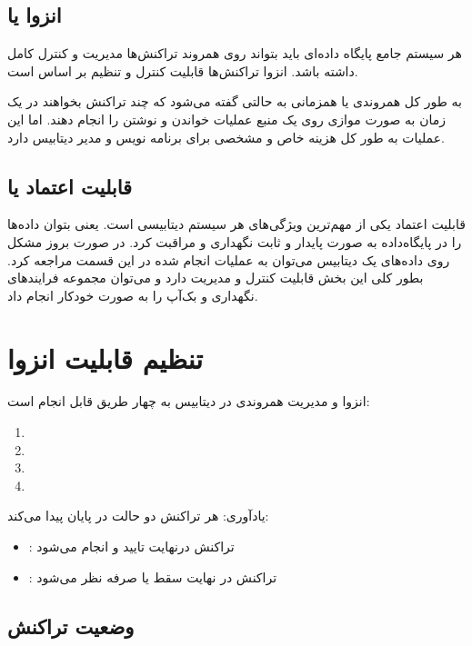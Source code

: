 \documentclass[a4paper]{article}
\begin{document}
\subsection{انزوا یا }

هر سیستم جامع پایگاه داده‌ای باید بتواند روی همروند تراکنش‌ها مدیریت و کنترل
کامل داشته باشد. انزوا تراکنش‌ها قابلیت کنترل و تنظیم بر اساس  است.

به طور کل همروندی یا همزمانی به حالتی گفته می‌شود که چند تراکنش بخواهند در یک
زمان به صورت موازی روی یک منبع عملیات خواندن و نوشتن را انجام دهند. اما این
عملیات به طور کل هزینه خاص و مشخصی برای برنامه نویس و مدیر دیتابیس دارد.

\subsection{قابلیت اعتماد یا }

قابلیت اعتماد یکی از مهم‌ترین ویژگی‌های هر سیستم دیتابیسی است. یعنی بتوان
داده‌ها را در پایگاه‌داده به صورت پایدار و ثابت نگهداری و مراقبت کرد. در صورت
بروز مشکل روی داده‌های یک دیتابیس می‌توان به عملیات انجام شده در این قسمت مراجعه
کرد. بطور کلی این بخش قابلیت کنترل و مدیریت دارد و می‌توان مجموعه فرایند‌های
نگهداری و بک‌آپ را به صورت خودکار انجام داد.

\section{تنظیم قابلیت انزوا}

انزوا و مدیریت همروندی در دیتابیس به چهار طریق قابل انجام است:

\begin{enumerate}
    \item {}
    \item {} 
    \item {}
    \item {}
\end{enumerate}

یادآوری: هر تراکنش دو حالت در پایان پیدا می‌کند:

\begin{itemize}
    \item {}: تراکنش درنهایت تایید و انجام می‌شود
    \item {}: تراکنش در نهایت سقط یا صرفه نظر می‌شود
\end{itemize}

\subsection{وضعیت تراکنش}
\end{document}
